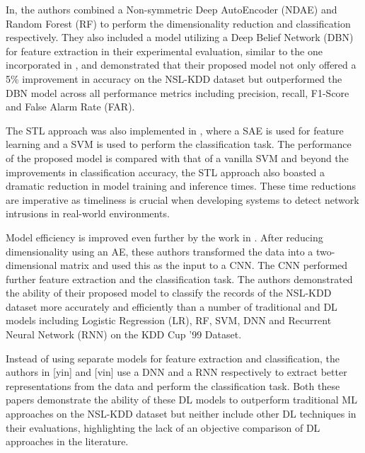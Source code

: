 \documentclass[conference]{IEEEtran}
\begin{document}
In\cite{b10}, the authors combined a Non-symmetric Deep AutoEncoder (NDAE) and Random Forest (RF) to perform the dimensionality reduction and classification respectively. They also included a model utilizing a Deep Belief Network (DBN) for feature extraction in their experimental evaluation, similar to the one incorporated in \cite{b6}, and demonstrated that their proposed model not only offered a 5\% improvement in accuracy on the NSL-KDD dataset but outperformed the DBN model across all performance metrics including precision, recall, F1-Score and False Alarm Rate (FAR). 

The STL approach was also implemented in \cite{al}, where a SAE is used for feature learning and a SVM is used to perform the classification task. The performance of the proposed model is compared with that of a vanilla SVM and beyond the improvements in classification accuracy, the STL approach also boasted a dramatic reduction in model training and inference times. These time reductions are imperative as timeliness is crucial when developing systems to detect network intrusions in real-world environments.

Model efficiency is improved even further by the work in \cite{xiao}. After reducing dimensionality using an AE, these authors transformed the data into a two-dimensional matrix and used this as the input to a CNN. The CNN performed further feature extraction and the classification task. The authors demonstrated the ability of their proposed model to classify the records of the NSL-KDD dataset more accurately and efficiently than a number of traditional and DL models including Logistic Regression (LR), RF, SVM, DNN and Recurrent Neural Network (RNN) on the KDD Cup '99 Dataset.

Instead of using separate models for feature extraction and classification, the authors in [yin] and [vin] use a DNN and a RNN respectively to extract better representations from the data and perform the classification task. Both these papers demonstrate the ability of these DL models to outperform traditional ML approaches on the NSL-KDD dataset but neither include other DL techniques in their evaluations, highlighting the lack of an objective comparison of DL approaches in the literature. 


\end{document}
